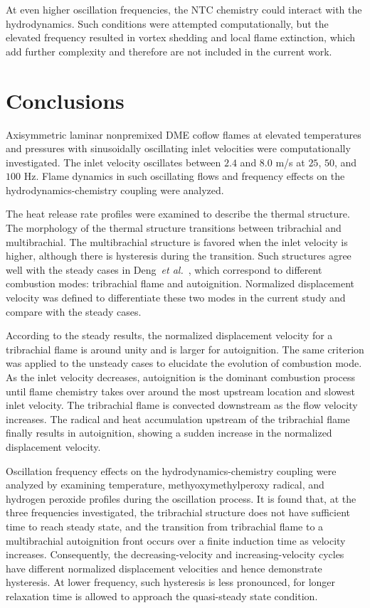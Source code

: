 \documentclass[review,3p,times]{elsarticle}
\begin{document}
\textcolor{Rev1}{At even higher oscillation frequencies, the NTC chemistry could interact with the hydrodynamics.  Such conditions were attempted computationally, but the elevated frequency resulted in vortex shedding and local flame extinction, which add further complexity and therefore are not included in the current work.}


\section{Conclusions}

Axisymmetric laminar nonpremixed DME coflow flames at elevated temperatures and pressures with sinusoidally oscillating inlet velocities were computationally investigated.  The inlet velocity oscillates between $2.4$ and $8.0$ m/s at $25$, $50$, and $100$ Hz.  Flame dynamics in such oscillating flows and frequency effects on the hydrodynamics-chemistry coupling were analyzed.

The heat release rate profiles were examined to describe the thermal structure.  The morphology of the thermal structure transitions between tribrachial and multibrachial.  The multibrachial structure is favored when the inlet velocity is higher, although there is hysteresis during the transition.  Such structures agree well with the steady cases in Deng~\emph{et al.}~\cite{deng15b}, which correspond to different combustion modes: tribrachial flame and autoignition.  Normalized displacement velocity was defined to differentiate these two modes in the current study and compare with the steady cases.  

According to the steady results, the normalized displacement velocity for a tribrachial flame is around unity and is larger for autoignition.  The same criterion was applied to the unsteady cases to elucidate the evolution of combustion mode.  As the inlet velocity decreases, autoignition is the dominant combustion process until flame chemistry takes over around the most upstream location and slowest inlet velocity.  The tribrachial flame is convected downstream as the flow velocity increases.  The radical and heat accumulation upstream of the tribrachial flame finally results in autoignition, showing a sudden increase in the normalized displacement velocity.  

\textcolor{Rev1}{Oscillation frequency effects on the hydrodynamics-chemistry coupling were analyzed by examining temperature, methyoxymethylperoxy radical, and hydrogen peroxide profiles during the oscillation process.  It is found that, at the three frequencies investigated, the tribrachial structure does not have sufficient time to reach steady state, and the transition from tribrachial flame to a multibrachial autoignition front occurs over a finite induction time as velocity increases.  Consequently, the decreasing-velocity and increasing-velocity cycles have different normalized displacement velocities and hence demonstrate hysteresis.  At lower frequency, such hysteresis is less pronounced, for longer relaxation time is allowed to approach the quasi-steady state condition.}  
\end{document}
